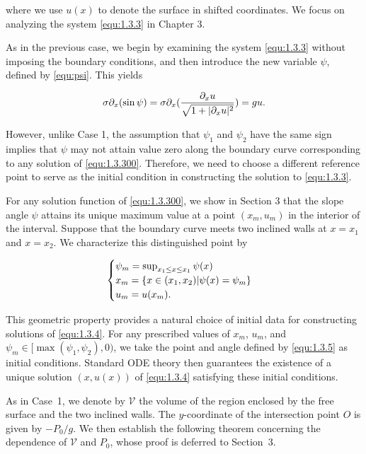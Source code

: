 \documentclass[letterpaper,reqno,10pt,twoside]{amsart}
\theoremstyle{definition}
\theoremstyle{remark}
\begin{document}
    \noindent where we use $u(x)$ to denote the surface in shifted coordinates. We focus on analyzing the system \eqref{equ:1.3.3} in Chapter 3.
    
      As in the previous case, we begin by examining the system \eqref{equ:1.3.3} without imposing the boundary conditions, and then introduce the new variable $\psi$, defined by \eqref{equ:psi}. This yields

      \begin{equation}{\label{equ:1.3.4}}
          \sigma\partial_{x}(\sin\psi)=\sigma\partial_{x}(\frac{\partial_{x}u}{\sqrt{1+\vert \partial_{x}u\vert^{2}}})=gu.
      \end{equation}

      \noindent However, unlike Case 1, the assumption that $\psi_{1}$ and $\psi_{2}$ have the same sign implies that $\psi$ may not attain value zero along the boundary curve corresponding to any solution of \eqref{equ:1.3.300}. Therefore, we need to choose a different reference point to serve as the initial condition in constructing the solution to \eqref{equ:1.3.3}. 
      
      For any solution function of \eqref{equ:1.3.300}, we show in Section 3 that the slope angle $\psi$ attains its unique maximum value at a point $(x_{m},u_{m})$ in the interior of the interval. Suppose that the boundary curve meets two inclined walls at $x=x_{1}$ and $x=x_{2}$. We characterize this distinguished point by

    \begin{equation}{\label{equ:1.3.5}}
    \begin{cases}
        \psi_{m}=\sup_{x_1\leq x\leq x_1} \psi(x)\\
         x_m=\{x\in(x_{1},x_{2})|\psi(x)=\psi_{m}\}\\
        u_m=u(x_m).
    \end{cases}
    \end{equation}

    \noindent This geometric property provides a natural choice of initial data for constructing solutions of \eqref{equ:1.3.4}. For any prescribed values of $x_{m}$, $u_{m}$, and $\psi_{m}\in[\max(\psi_{1},\psi_{2}),0)$, we take the point and angle defined by \eqref{equ:1.3.5} as initial conditions. Standard ODE theory then guarantees the existence of a unique solution $(x,u(x))$ of \eqref{equ:1.3.4} satisfying these initial conditions.

As in Case~1, we denote by $\mathscr{V}$ the volume of the region enclosed by the free surface and the two inclined walls. The $y$-coordinate of the intersection point $O$ is given by $-P_{0}/g$. We then establish the following theorem concerning the dependence of $\mathscr{V}$ and $P_{0}$, whose proof is deferred to Section~3.
\end{document}
